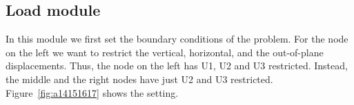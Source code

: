 \subsection{Load module}
\label{load_module1}%

In this module we first set the boundary conditions of the problem. For the node on the left we want to restrict the vertical, horizontal, and the out-of-plane displacements. Thus, the node on the left has U1, U2 and U3 restricted. Instead, the middle and the right nodes have just U2 and U3 restricted. Figure~\ref{fig:a14151617} shows the setting.

\begin{figure}[H]
    \centering
    \quad
\end{figure}
